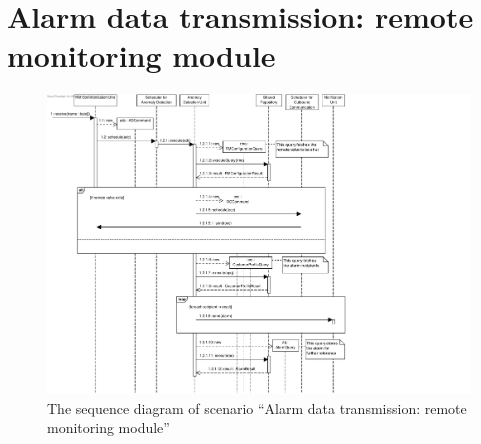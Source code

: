 \section{Alarm data transmission: remote monitoring module}
\label{scenario:rm-alarm}

\begin{figure}[H]
	\begin{centering}
		\includegraphics[width=\textwidth]{figs/scenario-5-9.pdf}
		\caption{The sequence diagram of scenario ``Alarm data transmission: remote monitoring module''}
		\label{fig:scenario-5-9}
	\end{centering}
\end{figure}